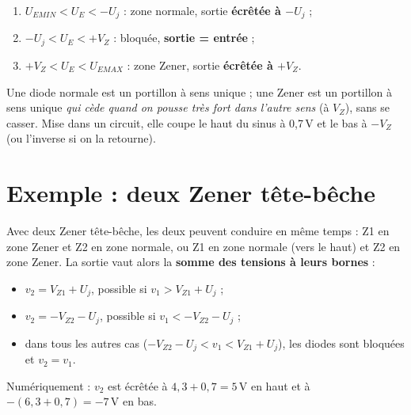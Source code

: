 
\begin{thmbox}[title={Zener, sens inverse (caractéristique pivotée de 180\ensuremath{^\circ}) : dual}]
\begin{enumerate}
  \item $U_{EMIN} < U_E < -U_j$ : zone normale, sortie \textbf{écrêtée à $-U_j$} ;
  \item $-U_j < U_E < +V_Z$ : bloquée, \textbf{sortie = entrée} ;
  \item $+V_Z < U_E < U_{EMAX}$ : zone Zener, sortie \textbf{écrêtée à $+V_Z$}.
\end{enumerate}
\end{thmbox}

\begin{goatbox}
Une diode normale est un portillon à sens unique ; une Zener est un portillon à sens unique
\emph{qui cède quand on pousse très fort dans l'autre sens} (à $V_Z$), sans se casser. Mise
dans un circuit, elle coupe le haut du sinus à 0,7\,V et le bas à $-V_Z$ (ou l'inverse si on
la retourne).
\end{goatbox}

\section{Exemple : deux Zener tête-bêche}


\begin{exbox}[title={Ce que dit le cours (question 1)}]
Avec deux Zener tête-bêche, les deux peuvent conduire en même temps : Z1 en zone Zener et Z2
en zone normale, ou Z1 en zone normale (vers le haut) et Z2 en zone Zener. La sortie vaut
alors la \textbf{somme des tensions à leurs bornes} :
\begin{itemize}
  \item $v_2 = V_{Z1} + U_j$, possible si $v_1 > V_{Z1} + U_j$ ;
  \item $v_2 = -V_{Z2} - U_j$, possible si $v_1 < -V_{Z2} - U_j$ ;
  \item dans tous les autres cas ($-V_{Z2} - U_j < v_1 < V_{Z1} + U_j$), les diodes sont
        bloquées et $v_2 = v_1$.
\end{itemize}
Numériquement : $v_2$ est écrêtée à $4{,}3 + 0{,}7 = 5$\,V en haut et à
$-(6{,}3 + 0{,}7) = -7$\,V en bas.
\end{exbox}

